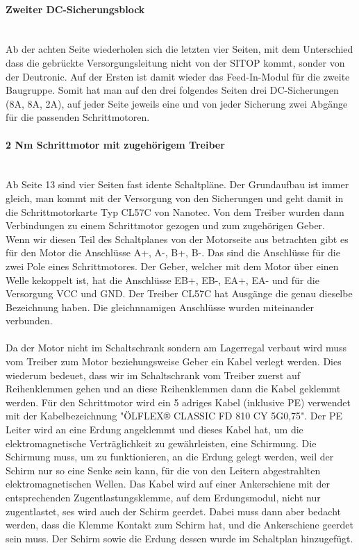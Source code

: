     \paragraph{Zweiter DC-Sicherungsblock}\mbox{}\\
    Ab der achten Seite wiederholen sich die letzten vier Seiten, mit dem Unterschied dass die gebrückte Versorgungsleitung nicht von der SITOP kommt, sonder von der Deutronic. Auf der Ersten ist damit wieder das Feed-In-Modul für die zweite Baugruppe. Somit hat man auf den drei folgendes Seiten drei DC-Sicherungen (8A, 8A, 2A), auf jeder Seite jeweils eine und von jeder Sicherung zwei Abgänge für die passenden Schrittmotoren.
    \paragraph{2 Nm Schrittmotor mit zugehörigem Treiber}\mbox{}\\
    Ab Seite 13 sind vier Seiten fast idente Schaltpläne. Der Grundaufbau ist immer gleich, man kommt mit der Versorgung von den Sicherungen und geht damit in die Schrittmotorkarte Typ CL57C von Nanotec. Von dem Treiber wurden dann Verbindungen zu einem Schrittmotor gezogen und zum zugehörigen Geber.\\
    Wenn wir diesen Teil des Schaltplanes von der Motorseite aus betrachten gibt es für den Motor die Anschlüsse A+, A-, B+, B-. Das sind die Anschlüsse für die zwei Pole eines Schrittmotores. Der Geber, welcher mit dem Motor über einen Welle kekoppelt ist, hat die Anschlüsse EB+, EB-, EA+, EA-  und für die Versorgung VCC und GND. Der Treiber CL57C hat Ausgänge die genau dieselbe Bezeichnung haben. Die gleichnnamigen Anschlüsse wurden miteinander verbunden. \\\\
    Da der Motor nicht im Schaltschrank sondern am Lagerregal verbaut wird muss vom Treiber zum Motor beziehungsweise Geber ein Kabel verlegt werden. Dies wiederum bedeuet, dass wir im Schaltschrank vom Treiber zuerst auf Reihenklemmen gehen und an diese Reihenklemmen dann die Kabel geklemmt werden. Für den Schrittmotor wird ein 5 adriges Kabel (inklusive PE) verwendet mit der Kabelbezeichnung "ÖLFLEX® CLASSIC FD 810 CY 5G0,75". Der PE Leiter wird an eine Erdung angeklemmt und dieses Kabel hat, um die elektromagnetische Verträglichkeit zu gewährleisten, eine Schirmung. Die Schirmung muss, um zu funktionieren, an die Erdung gelegt werden, weil der Schirm nur so eine Senke sein kann, für die von den Leitern abgestrahlten elektromagnetischen Wellen. Das Kabel wird auf einer Ankerschiene mit der entsprechenden Zugentlastungsklemme, auf dem Erdungsmodul, nicht nur zugentlastet, ses wird auch der Schirm geerdet. Dabei muss dann aber bedacht werden, dass die Klemme Kontakt zum Schirm hat, und die Ankerschiene geerdet sein muss. Der Schirm sowie die Erdung dessen wurde im Schaltplan hinzugefügt.    
